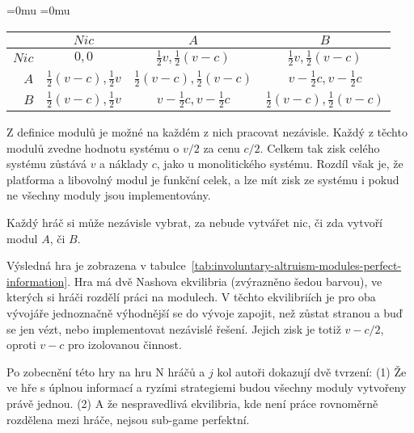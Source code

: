 \begin{multicols}{2}
			\begin{Figure}
			\begin{center}
			\begingroup
			\medmuskip=0mu
			\thickmuskip=0mu
				\makeatletter\def\f@size{8}
			\hskip-0.7cm
			\begin{tabular}{r| c c c}
					& $Nic$ & $A$ & $B$ \\
					\hline
				$Nic$ &
				 	$0,0$ &
					$\frac{1}{2}v, \frac{1}{2}(v-c)$ &
					$\frac{1}{2}v, \frac{1}{2}(v-c)$ \\
				$A$ &
					$\frac{1}{2}(v-c), \frac{1}{2}v$ &
					$\frac{1}{2}(v-c), \frac{1}{2}(v-c)$ &
					\cellcolor{gray!20}$v-\frac{1}{2}c, v-\frac{1}{2}c$ \\
				$B$ &
					$\frac{1}{2}(v-c), \frac{1}{2}v$ &
					\cellcolor{gray!20}$v-\frac{1}{2}c, v-\frac{1}{2}c$ &
					$\frac{1}{2}(v-c), \frac{1}{2}(v-c)$ \\
			\end{tabular}
			\endgroup
			\end{center}
			\label{tab:involuntary-altruism-modules-perfect-information}
			\end{Figure}

		Z definice modulů je možné na každém z nich pracovat nezávisle. Každý z těchto modulů zvedne hodnotu systému o $v/2$ za cenu $c/2$. Celkem tak zisk celého systému zůstává $v$ a náklady $c$, jako u monolitického systému. Rozdíl však je, že platforma a libovolný modul je funkční celek, a lze mít zisk ze systému i pokud ne všechny moduly jsou implementovány.

		Každý hráč si může nezávisle vybrat, za nebude vytvářet nic, či zda vytvoří modul $A$, či $B$.

		Výsledná hra je zobrazena v tabulce~\ref{tab:involuntary-altruism-modules-perfect-information}. Hra má dvě Nashova ekvilibria (zvýrazněno šedou barvou), ve kterých si hráči rozdělí práci na modulech. V těchto ekvilibriích je pro oba vývojáře jednoznačně výhodnější se do vývoje zapojit, než zůstat stranou a buď se jen vézt, nebo implementovat nezávislé řešení. Jejich zisk je totiž $v - c/2$, oproti $v-c$ pro izolovanou činnost.

		Po zobecnění této hry na hru N hráčů a $j$ kol autoři dokazují dvě tvrzení: (1) Že ve hře s úplnou informací a ryzími strategiemi budou všechny moduly vytvořeny právě jednou. (2) A že nespravedlivá ekvilibria, kde není práce rovnoměrně rozdělena mezi hráče, nejsou sub-game perfektní.


\end{multicols}
